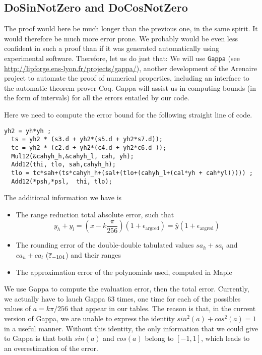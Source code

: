 \subsection{DoSinNotZero and DoCosNotZero\label{sec:dosinnotzero} }

The proof would here be much longer than the previous one, in the same
spirit. It would therefore be much more error prone. We probably would
be even less confident in such a proof than if it was generated
automatically using experimental software. Therefore, let us do just
that: We will use \texttt{Gappa} (see
\url{http://lipforge.ens-lyon.fr/projects/gappa/}), another
development of the Arenaire project to automate the proof of numerical
properties, including an interface to the automatic theorem prover
Coq. Gappa will assist us in computing bounds (in the form of
intervals) for all the errors entailed by our code.


Here we need to compute the error bound for the following straight line of
code.

\begin{lstlisting}[caption={DoSinNotZero},firstnumber=1]
  yh2 = yh*yh ;
  ts = yh2 * (s3.d + yh2*(s5.d + yh2*s7.d));	
  tc = yh2 * (c2.d + yh2*(c4.d + yh2*c6.d ));	
  Mul12(&cahyh_h,&cahyh_l, cah, yh);				       
  Add12(thi, tlo, sah,cahyh_h);					       
  tlo = tc*sah+(ts*cahyh_h+(sal+(tlo+(cahyh_l+(cal*yh + cah*yl))))) ;  
  Add12(*psh,*psl,  thi, tlo);	   			               
\end{lstlisting}

The additional information we have is 

\begin{itemize}

\item The range reduction total absolute error, such that 
  \begin{equation}
    y_h+y_l = (x-k\frac{\pi}{256})(1+\epsilon_{\mathrm{argred}}) 
    = \hat{y}(1+\epsilon_{\mathrm{argred}})
  \end{equation}

\item The rounding error of the double-double tabulated values
  $sa_h+sa_l$ and  $ca_h+ca_l$  (${\overline{\varepsilon}}_{-104}$) and their ranges

\item The approximation error of the polynomials used, computed in
  Maple
\end{itemize}

We use Gappa to compute the evaluation error, then the total error.
Currently, we actually have to lauch Gappa 63 times, one time for each
of the possibles values of $a=k\pi/256$ that appear in our tables. The
reason is that, in the current version of Gappa, we are unable to
express the identity $sin^2(a) + cos^2(a) = 1$ in a useful manner.
Without this identity, the only information that we could give to
Gappa is that both $sin(a)$ and $cos(a)$ belong to $[-1,1]$, which
leads to an overestimation of the error.

